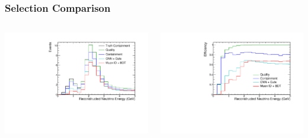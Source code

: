 \documentclass[10pt,professionalfonts,xcolor=table]{beamer}
\begin{document}
\begin{frame}
\frametitle{Selection Comparison}

\begin{columns}
  \begin{center}
   \includegraphics[height=\textwidth, angle=-90]{figures/selection/cosmic_sig_osc.pdf}
  \end{center}

  \begin{center}
   \includegraphics[height=\textwidth, angle=-90]{figures/selection/cosmic_sig_eff_osc.pdf}
  \end{center}


\end{columns}
\end{frame}
\end{document}

